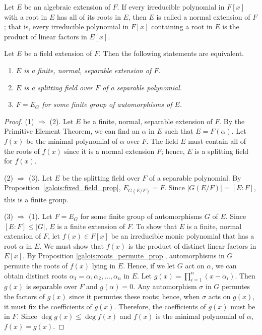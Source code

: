  
\medskip
 
 
Let $E$ be an algebraic extension of $F$. If every irreducible
polynomial in $F[x]$ with a root in $E$ has all of its roots in
$E$, then $E$ is called a {\bfi normal
extension\/} of $F$;
that is, every irreducible polynomial in $F[x]$ containing a root in
$E$ is the product of linear factors in $E[x]$. 
 
 
\begin{theorem}
Let $E$ be a field extension of $F$. Then the following statements are
equivalent.
\begin{enumerate}
 
\rm \item \it
$E$ is a finite, normal, separable extension of $F$.
 
\rm \item \it
$E$ is a splitting field over $F$ of a separable polynomial.
 
\rm \item \it
$F = E_G$ for some finite group of automorphisms of $E$.
 
\end{enumerate}
\end{theorem}
 
 
\begin{proof}
(1) $\Rightarrow$ (2). 
Let $E$ be a finite, normal, separable extension of $F$. By the
Primitive Element Theorem, we can find an  $\alpha$ in $E$ such that
$E = F(\alpha)$. Let $f(x)$ be the minimal polynomial of $\alpha$ over
$F$. The field $E$ must contain all of the roots of $f(x)$ since it is
a normal extension $F$; hence, $E$ is a splitting field for $f(x)$.
 
 
(2) $\Rightarrow$ (3). 
Let $E$ be the splitting field over $F$ of a separable polynomial. By
Proposition~\ref{galois:fixed_field_prop}, $E_{G(E/F)} = F$. Since $| G(E/F)| = [E:F]$, this is
a finite group. 
 
(3) $\Rightarrow$ (1). 
Let $F = E_G$ for some finite group of automorphisms $G$ of $E$. Since
$[E:F] \leq |G|$, $E$ is a finite extension of $F$. To show that $E$
is a finite, normal extension of  $F$, let $f(x) \in F[x]$ be an
irreducible monic polynomial that has a root $\alpha$ in $E$. We must
show that $f(x)$ is the product of distinct linear factors in $E[x]$.
By Proposition \ref{galois:roots_permute_prop}, automorphisms in $G$ permute the roots of $f(x)$
lying in $E$. Hence, if we let $G$ act on $\alpha$, we can obtain
distinct roots $\alpha_1 = \alpha, \alpha_2, \ldots, \alpha_n$ in $E$.
Let $g(x) = \prod_{i=1}^{n} (x -\alpha_i)$. Then $g(x)$ is separable
over $F$ and $g( \alpha ) = 0$. Any automorphism $\sigma$ in $G$
permutes the factors of $g(x)$ since it permutes these roots; hence,
when $\sigma$ acts on $g(x)$, it must fix the coefficients of $g(x)$.
Therefore, the coefficients of $g(x)$ must be in $F$. Since $\deg g(x)
\leq \deg f(x)$ and $f(x)$ is the minimal polynomial of $\alpha$,
$f(x) = g(x)$.
\end{proof}
 
